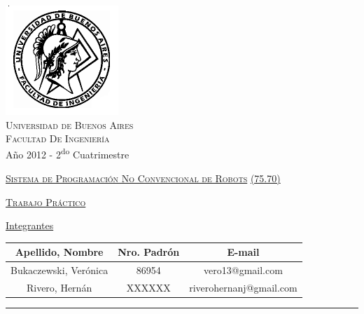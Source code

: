 \documentclass[12pt,titlepage]{article}
\begin{document}
\begin{titlepage}

\thispagestyle{empty}

\begin{center}
\includegraphics[scale=0.55]{./Images/fiuba}\\
\large{\textsc{Universidad de Buenos Aires}}\\
\large{\textsc{Facultad De Ingeniería}}\\
\small{Año 2012 - 2\textsuperscript{do} Cuatrimestre}
\end{center}

\vfill

\begin{center}

\Large{\underline{\textsc{Sistema de Programaci\'on No Convencional de Robots}}}
\Large{\underline{\textsc{(75.70)}}}

\vfill


\Large{\underline{\textsc{Trabajo Pr\'actico}}}

\vfill

\Large\underline{Integrantes} \linebreak\linebreak

\large\addtolength{\tabcolsep}{-3pt}
\begin{tabular}{|| c | c | c ||}
\hline
\textbf{Apellido, Nombre} & \textbf{Nro. Padrón} & \textbf{E-mail} \\
\hline
Bukaczewski, Verónica & 86954 & vero13@gmail.com \\
\hline
Rivero, Hern\'an & XXXXXX & riverohernanj@gmail.com \\
\hline
\end{tabular}
\end{center}

\vfill

\hrule
\vspace{0.2cm}


\end{titlepage}
\end{document}
